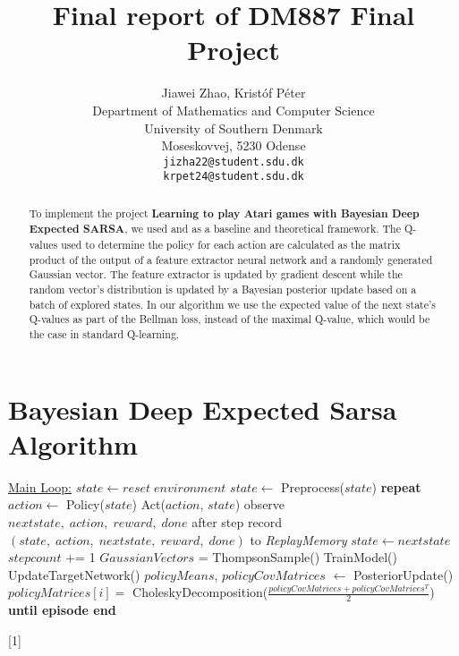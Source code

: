 \documentclass{article}
\title{Final report of DM887 Final Project}
\author{%
  Jiawei Zhao, Kristóf Péter\\
  Department of Mathematics and Computer Science\\
  University of Southern Denmark\\
  Moseskovvej, 5230 Odense \\
  \texttt{jizha22@student.sdu.dk} \\
  \texttt{krpet24@student.sdu.dk} \\
}
\begin{document}
\maketitle


\begin{abstract}
  To implement the project \textbf{Learning to play Atari games with Bayesian Deep Expected SARSA}, we used \cite{BDQN} and \cite{EEtBDQN} as a baseline and theoretical framework. The Q-values used to determine the policy for each action are calculated as the matrix product of the output of a feature extractor neural network and a randomly generated Gaussian vector. The feature extractor is updated by gradient descent while the random vector's distribution is updated by a Bayesian posterior update based on a batch of explored states. In our algorithm we use the expected value of the next state's Q-values as part of the Bellman loss, instead of the maximal Q-value, which would be the case in standard Q-learning.
\end{abstract}

\section{Bayesian Deep Expected Sarsa Algorithm}

\begin{algorithm}
    \begin{algorithmic}[1]
    \State \underline{Main Loop:}
            \State $ state \gets reset\;environment$
            \State $ state \gets$ Preprocess($state$)
            \State \textbf{repeat}
                \State $action \gets$ Policy($state$)
                \State Act($action$, $state$)
                \State observe $nextstate,\;action,\;reward,\;done$ after step
                \State record $(state,\;action,\;nextstate,\;reward,\;done)$ to \textit{ReplayMemory}
                \State $state \gets nextstate$
                \State $stepcount$ += 1
                    \State $GaussianVectors$ = ThompsonSample()
                \EndIf
                    \State TrainModel()
                \EndIf
                    \State UpdateTargetNetwork()
                        \State $policyMeans$, $policyCovMatrices$ $\gets$ PosteriorUpdate()
                            \State$policyMatrices[i] =$ CholeskyDecomposition($\frac{policyCovMatrices + policyCovMatrices^T}{2}$)
                        \EndFor
                    \EndIf
                \EndIf
            \State \textbf{until episode end}
        \EndFor
    \end{algorithmic}[1]
\end{algorithm}
\end{document}
